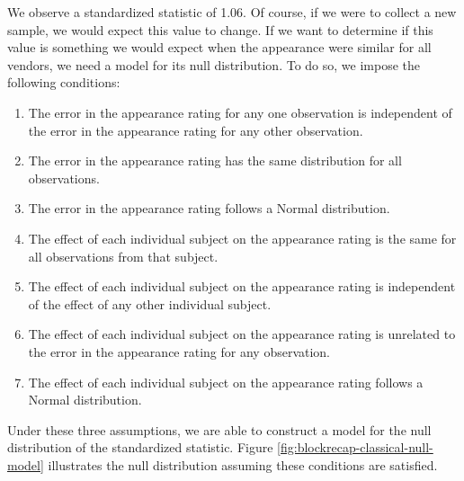 \documentclass[]{book}
\providecommand{\tightlist}{%
  \setlength{\itemsep}{0pt}\setlength{\parskip}{0pt}}
\theoremstyle{plain}
\theoremstyle{mydefn}
\theoremstyle{myexmpl}
\theoremstyle{remark}
\begin{document}
We observe a standardized statistic of 1.06. Of course, if we were to
collect a new sample, we would expect this value to change. If we want
to determine if this value is something we would expect when the
appearance were similar for all vendors, we need a model for its null
distribution. To do so, we impose the following conditions:

\begin{enumerate}
\def\labelenumi{\arabic{enumi}.}
\tightlist
\item
  The error in the appearance rating for any one observation is
  independent of the error in the appearance rating for any other
  observation.
\item
  The error in the appearance rating has the same distribution for all
  observations.
\item
  The error in the appearance rating follows a Normal distribution.
\item
  The effect of each individual subject on the appearance rating is the
  same for all observations from that subject.
\item
  The effect of each individual subject on the appearance rating is
  independent of the effect of any other individual subject.
\item
  The effect of each individual subject on the appearance rating is
  unrelated to the error in the appearance rating for any observation.
\item
  The effect of each individual subject on the appearance rating follows
  a Normal distribution.
\end{enumerate}

Under these three assumptions, we are able to construct a model for the
null distribution of the standardized statistic. Figure
\ref{fig:blockrecap-classical-null-model} illustrates the null
distribution assuming these conditions are satisfied.
\end{document}
